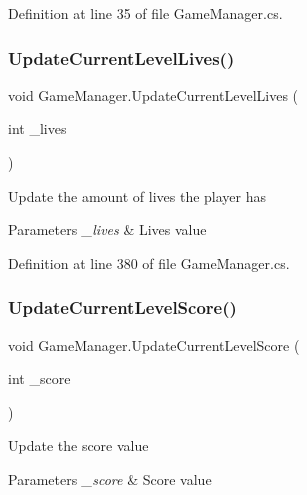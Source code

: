 Definition at line 35 of file Game\+Manager.\+cs.

\mbox{\label{class_game_manager_a66796650182ecf1f1dc98c8ee889d1a0}} 
\subsubsection{\texorpdfstring{Update\+Current\+Level\+Lives()}{UpdateCurrentLevelLives()}}
{\footnotesize\ttfamily void Game\+Manager.\+Update\+Current\+Level\+Lives (\begin{DoxyParamCaption}\item[{int}]{\+\_\+lives }\end{DoxyParamCaption})}



Update the amount of lives the player has 


\begin{DoxyParams}{Parameters}
{\em \+\_\+lives} & Lives value\\
\hline
\end{DoxyParams}


Definition at line 380 of file Game\+Manager.\+cs.

\mbox{\label{class_game_manager_ae77f42a6ee1bb7d5192709d24cf6ed34}} 
\subsubsection{\texorpdfstring{Update\+Current\+Level\+Score()}{UpdateCurrentLevelScore()}}
{\footnotesize\ttfamily void Game\+Manager.\+Update\+Current\+Level\+Score (\begin{DoxyParamCaption}\item[{int}]{\+\_\+score }\end{DoxyParamCaption})}



Update the score value 


\begin{DoxyParams}{Parameters}
{\em \+\_\+score} & Score value\\
\hline
\end{DoxyParams}


